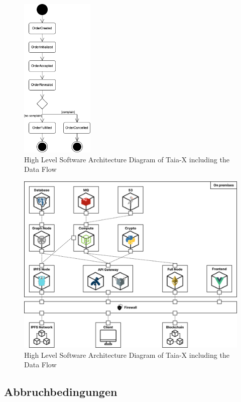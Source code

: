 \begin{figure}[!htb]
    \centering
    \includegraphics[width=3.5cm]{images/lifecycle.png}
    \caption[High Level Software Architecture Diagram of Taia-X]{High Level Software Architecture Diagram of Taia-X including the Data Flow}
    \label{fig:arch}
\end{figure}

\begin{figure}[!htb]
    \centering
    \includegraphics[width=12cm]{images/architecture.png}
    \caption[High Level Software Architecture Diagram of Taia-X]{High Level Software Architecture Diagram of Taia-X including the Data Flow}
    \label{fig:arch}
\end{figure}

\subsection{Abbruchbedingungen}
\label{subsection:cancel}

